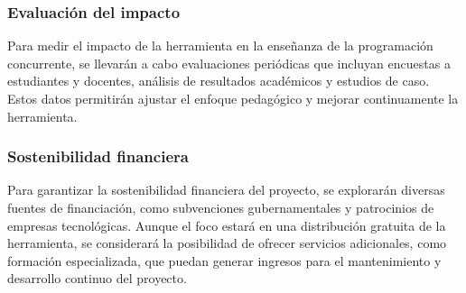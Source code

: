 \subsubsection{Evaluación del impacto}

Para medir el impacto de la herramienta en la enseñanza de la programación concurrente, se llevarán a cabo evaluaciones periódicas que incluyan encuestas a estudiantes y docentes, análisis de resultados académicos y estudios de caso. Estos datos permitirán ajustar el enfoque pedagógico y mejorar continuamente la herramienta.

\subsubsection{Sostenibilidad financiera}
Para garantizar la sostenibilidad financiera del proyecto, se explorarán diversas fuentes de financiación, como subvenciones gubernamentales y patrocinios de empresas tecnológicas. Aunque el foco estará en una distribución gratuita de la herramienta, se considerará la posibilidad de ofrecer servicios adicionales, como formación especializada, que puedan generar ingresos para el mantenimiento y desarrollo continuo del proyecto.